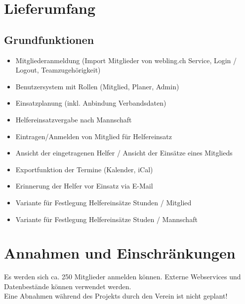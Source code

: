 \section{Lieferumfang}
\subsection{Grundfunktionen}
\begin{itemize}
    \item Mitgliederanmeldung (Import Mitglieder von webling.ch Service, Login / Logout, Teamzugehörigkeit)
    \item Benutzersystem mit Rollen (Mitglied, Planer, Admin)
    \item Einsatzplanung (inkl. Anbindung Verbandsdaten)
    \item Helfereinsatzvergabe nach Mannschaft
    \item Eintragen/Anmelden von Mitglied für Helfereinsatz
    \item Ansicht der eingetragenen Helfer / Ansicht der Einsätze eines Mitglieds
    \item Exportfunktion der Termine (Kalender, iCal)
    \item Erinnerung der Helfer vor Einsatz via E-Mail
    \item Variante für Festlegung Helfereinsätze Stunden / Mitglied
    \item Variante für Festlegung Helfereinsätze Studen  / Mannschaft
\end{itemize}

\section{Annahmen und Einschränkungen}
Es werden sich ca. 250 Mitglieder anmelden können.
Externe Webservices und Datenbestände können verwendet werden.
\\ Eine Abnahmen während des Projekts durch den Verein ist nicht geplant!